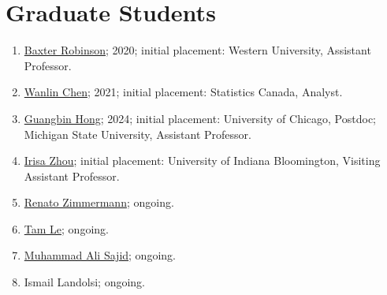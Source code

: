 \documentclass[letterpaper]{article}
\begin{document}
\section*{Graduate Students}
\begin{enumerate}
\item \href{https://sites.google.com/view/baxter-robinson}{Baxter Robinson}; 2020; initial placement: Western University, Assistant Professor.
\item \href{https://sites.google.com/view/wanlin-chen}{Wanlin Chen}; 2021; initial placement: Statistics Canada, Analyst.
\item \href{https://www.guangbinhong.com}{Guangbin Hong}; 2024; initial placement: University of Chicago, Postdoc; Michigan State University, Assistant Professor.
\item \href{https://www.irisazhou.com}{Irisa Zhou}; initial placement: University of Indiana Bloomington, Visiting Assistant Professor.
\item \href{https://renatomatz.github.io}{Renato Zimmermann}; ongoing.
\item \href{https://www.economics.utoronto.ca/index.php/i/person/gradStudent/1003622}{Tam Le}; ongoing.
\item \href{https://alisajid.com}{Muhammad Ali Sajid}; ongoing.
\item Ismail Landolsi; ongoing.
\end{enumerate}

\end{document}
